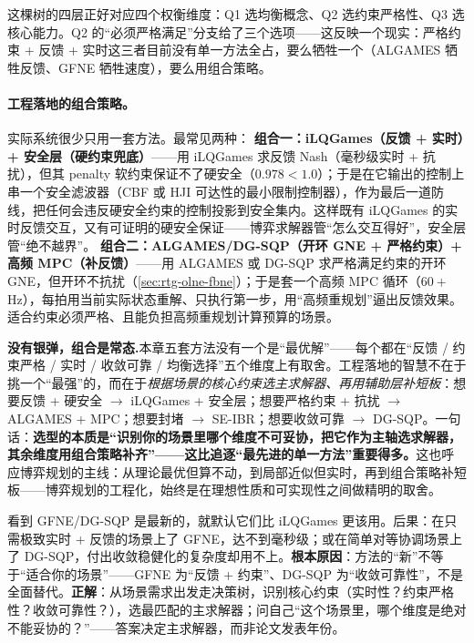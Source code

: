 \noindent 这棵树的四层正好对应四个权衡维度：Q1 选均衡概念、Q2 选约束严格性、Q3 选核心能力。Q2 的“必须严格满足”分支给了三个选项——这反映一个现实：严格约束 + 反馈 + 实时这三者目前没有单一方法全占，要么牺牲一个（ALGAMES 牺牲反馈、GFNE 牺牲速度），要么用组合策略。

\paragraph{工程落地的组合策略。}
实际系统很少只用一套方法。最常见两种：
\textbf{组合一：iLQGames（反馈 + 实时）+ 安全层（硬约束兜底）}——用 iLQGames 求反馈 Nash（毫秒级实时 + 抗扰），但其 penalty 软约束保证不了硬安全（$0.978<1.0$）；于是在它输出的控制上串一个安全滤波器（CBF 或 HJI 可达性的最小限制控制器），作为最后一道防线，把任何会违反硬安全约束的控制投影到安全集内。这样既有 iLQGames 的实时反馈交互，又有可证明的硬安全保证——博弈求解器管“怎么交互得好”，安全层管“绝不越界”。
\textbf{组合二：ALGAMES/DG-SQP（开环 GNE + 严格约束）+ 高频 MPC（补反馈）}——用 ALGAMES 或 DG-SQP 求严格满足约束的开环 GNE，但开环不抗扰（\cref{sec:rtg-olne-fbne}）；于是套一个高频 MPC 循环（$60+$\,Hz），每拍用当前实际状态重解、只执行第一步，用“高频重规划”逼出反馈效果。适合约束必须严格、且能负担高频重规划计算预算的场景。

\begin{insight}
\textbf{没有银弹，组合是常态.}\;本章五套方法没有一个是“最优解”——每个都在“反馈 / 约束严格 / 实时 / 收敛可靠 / 均衡选择”五个维度上有取舍。工程落地的智慧不在于挑一个“最强”的，而在于\emph{根据场景的核心约束选主求解器、再用辅助层补短板}：想要反馈 + 硬安全 $\to$ iLQGames + 安全层；想要严格约束 + 抗扰 $\to$ ALGAMES + MPC；想要封堵 $\to$ SE-IBR；想要收敛可靠 $\to$ DG-SQP。一句话：\textbf{选型的本质是“识别你的场景里哪个维度不可妥协，把它作为主轴选求解器，其余维度用组合策略补齐”——这比追逐“最先进的单一方法”重要得多。}这也呼应博弈规划的主线：从理论最优但算不动，到局部近似但实时，再到组合策略补短板——博弈规划的工程化，始终是在理想性质和可实现性之间做精明的取舍。
\end{insight}

\begin{pitfall}
看到 GFNE/DG-SQP 是最新的，就默认它们比 iLQGames 更该用。后果：在只需极致实时 + 反馈的场景上了 GFNE，达不到毫秒级；或在简单对等协调场景上了 DG-SQP，付出收敛稳健化的复杂度却用不上。\textbf{根本原因}：方法的“新”不等于“适合你的场景”——GFNE 为“反馈 + 约束”、DG-SQP 为“收敛可靠性”，不是全面替代。\textbf{正解}：从场景需求出发走决策树，识别核心约束（实时性？约束严格性？收敛可靠性？），选最匹配的主求解器；问自己“这个场景里，哪个维度是绝对不能妥协的？”——答案决定主求解器，而非论文发表年份。
\end{pitfall}

